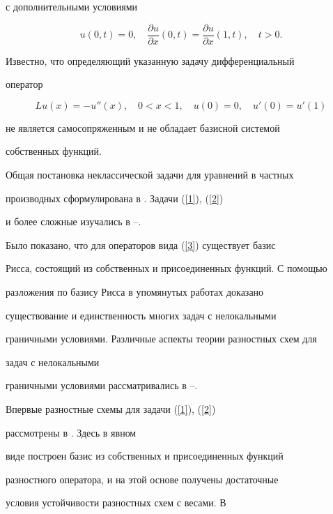 с дополнительными условиями


\begin{equation}\label{2}


u(0,t)=0,\quad \frac{{\partial u}} {{\partial x}}({0,t}


)=\frac{{\partial u}} {{\partial x}}({1,t}),\quad t > 0.


\end{equation}


Известно, что определяющий указанную задачу дифференциальный


оператор


\begin{equation}\label{3}


Lu(x)=-u''(x),\quad 0<x<1, \quad u(0)=0,\quad u'(0)=u'(1)


\end{equation}


не является самосопряженным и не обладает базисной системой


собственных функций.





Общая постановка неклассической задачи для уравнений в частных


производных сформулирована в \cite{1}. Задачи (\ref{1}), (\ref{2})


и более сложные изучались в \cite{2}--\cite{5}.


Было показано, что для операторов вида (\ref{3}) существует базис


Рисса, состоящий из собственных и присоединенных функций. С помощью


разложения по базису Рисса в упомянутых работах доказано


существование и единственность многих задач с нелокальными


граничными условиями. Различные аспекты теории разностных схем для


задач с нелокальными 


граничными условиями рассматривались в \cite{6}--\cite{9}.


Впервые разностные схемы для задачи (\ref{1}), (\ref{2})


рассмотрены в \cite{10}. Здесь в явном


виде построен базис из собственных и присоединенных функций


разностного оператора, и на этой основе получены достаточные


условия устойчивости разностных схем с весами. В 



